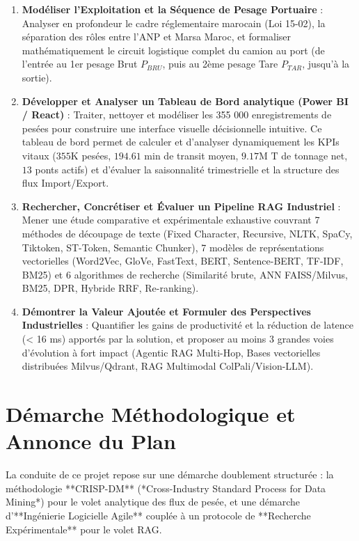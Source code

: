 \documentclass[12pt,a4paper,oneside]{report}
\begin{document}
\begin{enumerate}
    \item \textbf{Modéliser l'Exploitation et la Séquence de Pesage Portuaire} : Analyser en profondeur le cadre réglementaire marocain (Loi 15-02), la séparation des rôles entre l'ANP et Marsa Maroc, et formaliser mathématiquement le circuit logistique complet du camion au port (de l'entrée au 1er pesage Brut $P_{BRU}$, puis au 2ème pesage Tare $P_{TAR}$, jusqu'à la sortie).
    \item \textbf{Développer et Analyser un Tableau de Bord analytique (Power BI / React)} : Traiter, nettoyer et modéliser les 355 000 enregistrements de pesées pour construire une interface visuelle décisionnelle intuitive. Ce tableau de bord permet de calculer et d'analyser dynamiquement les KPIs vitaux ($355\text{K}$ pesées, $194.61\text{ min}$ de transit moyen, $9.17\text{M T}$ de tonnage net, $13$ ponts actifs) et d'évaluer la saisonnalité trimestrielle et la structure des flux Import/Export.
    \item \textbf{Rechercher, Concrétiser et Évaluer un Pipeline RAG Industriel} : Mener une étude comparative et expérimentale exhaustive couvrant 7 méthodes de découpage de texte (Fixed Character, Recursive, NLTK, SpaCy, Tiktoken, ST-Token, Semantic Chunker), 7 modèles de représentations vectorielles (Word2Vec, GloVe, FastText, BERT, Sentence-BERT, TF-IDF, BM25) et 6 algorithmes de recherche (Similarité brute, ANN FAISS/Milvus, BM25, DPR, Hybride RRF, Re-ranking).
    \item \textbf{Démontrer la Valeur Ajoutée et Formuler des Perspectives Industrielles} : Quantifier les gains de productivité et la réduction de latence (< 16 ms) apportés par la solution, et proposer au moins 3 grandes voies d'évolution à fort impact (Agentic RAG Multi-Hop, Bases vectorielles distribuées Milvus/Qdrant, RAG Multimodal ColPali/Vision-LLM).
\end{enumerate}

\section*{Démarche Méthodologique et Annonce du Plan}
La conduite de ce projet repose sur une démarche doublement structurée : la méthodologie **CRISP-DM** (*Cross-Industry Standard Process for Data Mining*) pour le volet analytique des flux de pesée, et une démarche d'**Ingénierie Logicielle Agile** couplée à un protocole de **Recherche Expérimentale** pour le volet RAG.
\end{document}
